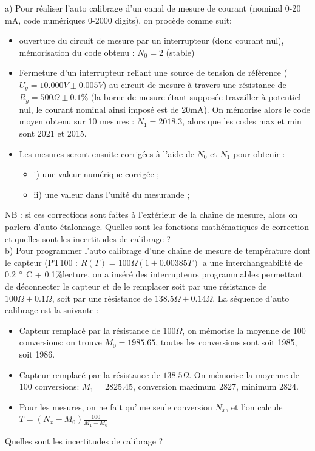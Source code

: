 a)	Pour réaliser l'auto calibrage d'un canal de mesure de courant (nominal 0-20 mA, code numériques 0-2000 digits), on procède comme suit:
\begin{itemize}
    \item ouverture du circuit de mesure par un interrupteur (donc courant nul), mémorisation du code obtenu :  $N_0=2$ (stable)
    \item Fermeture d'un interrupteur reliant une source de tension de référence ($U_g = 10.000V \pm 0.005V$) au circuit de mesure à travers une résistance de $R_g = 500 \Omega \pm 0.1\%$ (la borne de mesure étant supposée travailler à potentiel nul, le courant nominal ainsi imposé est de 20mA). On mémorise alors le code moyen obtenu sur 10 mesures : $N_1 = 2018.3$, alors que les codes max et min sont 2021 et 2015.
    \item Les mesures seront ensuite corrigées à l'aide de $N_0$ et $N_1$ pour obtenir :
          \begin{itemize}\itemsep1pt
                    \renewcommand{\labelitemi}{$\bullet$}
              \item i) une valeur numérique corrigée ;
              \item ii) une valeur dans l'unité du mesurande ;
          \end{itemize}
\end{itemize}
NB : si ces corrections sont faites à l'extérieur de la chaîne de mesure, alors on parlera d'auto étalonnage.
Quelles sont les fonctions mathématiques de correction et quelles sont les incertitudes de calibrage ?\\

b)	Pour programmer l'auto calibrage d'une chaîne de mesure de température dont le capteur (PT100 : $R(T)=100 \Omega (1+0.00385T)$ a une interchangeabilité de 0.2 $\degree$ C + 0.1\%lecture, on a inséré des interrupteurs programmables permettant de déconnecter le capteur et de le remplacer soit par une résistance de$ 100 \Omega \pm 0.1 \Omega$, soit par une résistance de $138.5 \Omega \pm 0.14 \Omega$. La séquence d'auto calibrage est la suivante :
\begin{itemize}
    \item Capteur remplacé par la résistance de $100 \Omega$, on mémorise la moyenne de 100 conversions: on trouve $M_0=1985.65$, toutes les conversions sont soit 1985, soit 1986.
    \item Capteur remplacé par la résistance de $138.5 \Omega$. On mémorise la moyenne de 100 conversions: $M_1=2825.45$, conversion maximum 2827, minimum 2824.
    \item Pour les mesures, on ne fait qu'une seule conversion $N_x$, et l'on calcule \\
          $T= (N_x - M_0)\frac{100}{M_1 - M_0}$
\end{itemize}
Quelles sont les incertitudes de calibrage ? \\

